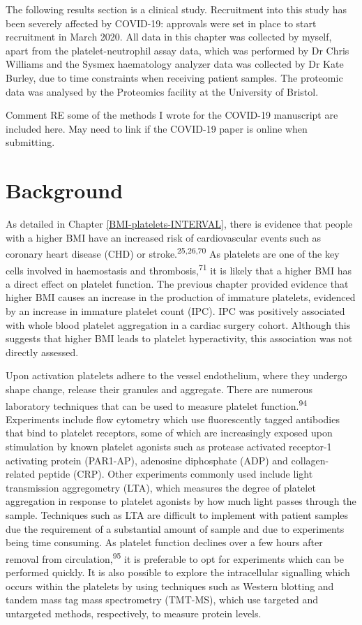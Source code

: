 \documentclass[11pt,twoside]{bristolthesis}
\begin{document}
The following results section is a clinical study. Recruitment into this study has been severely affected by COVID-19: approvals were set in place to start recruitment in March 2020. All data in this chapter was collected by myself, apart from the platelet-neutrophil assay data, which was performed by Dr Chris Williams and the Sysmex haematology analyzer data was collected by Dr Kate Burley, due to time constraints when receiving patient samples. The proteomic data was analysed by the Proteomics facility at the University of Bristol.

Comment RE some of the methods I wrote for the COVID-19 manuscript are included here. May need to link if the COVID-19 paper is online when submitting.

\hypertarget{background-2}{%
\section{Background}\label{background-2}}

As detailed in Chapter \ref{BMI-platelets-INTERVAL}, there is evidence that people with a higher BMI have an increased risk of cardiovascular events such as coronary heart disease (CHD) or stroke.\textsuperscript{25,26,70} As platelets are one of the key cells involved in haemostasis and thrombosis,\textsuperscript{71} it is likely that a higher BMI has a direct effect on platelet function. The previous chapter provided evidence that higher BMI causes an increase in the production of immature platelets, evidenced by an increase in immature platelet count (IPC). IPC was positively associated with whole blood platelet aggregation in a cardiac surgery cohort. Although this suggests that higher BMI leads to platelet hyperactivity, this association was not directly assessed.

Upon activation platelets adhere to the vessel endothelium, where they undergo shape change, release their granules and aggregate. There are numerous laboratory techniques that can be used to measure platelet function.\textsuperscript{94} Experiments include flow cytometry which use fluorescently tagged antibodies that bind to platelet receptors, some of which are increasingly exposed upon stimulation by known platelet agonists such as protease activated receptor-1 activating protein (PAR1-AP), adenosine diphosphate (ADP) and collagen-related peptide (CRP). Other experiments commonly used include light transmission aggregometry (LTA), which measures the degree of platelet aggregation in response to platelet agonists by how much light passes through the sample. Techniques such as LTA are difficult to implement with patient samples due the requirement of a substantial amount of sample and due to experiments being time consuming. As platelet function declines over a few hours after removal from circulation,\textsuperscript{95} it is preferable to opt for experiments which can be performed quickly. It is also possible to explore the intracellular signalling which occurs within the platelets by using techniques such as Western blotting and tandem mass tag mass spectrometry (TMT-MS), which use targeted and untargeted methods, respectively, to measure protein levels.
\end{document}
